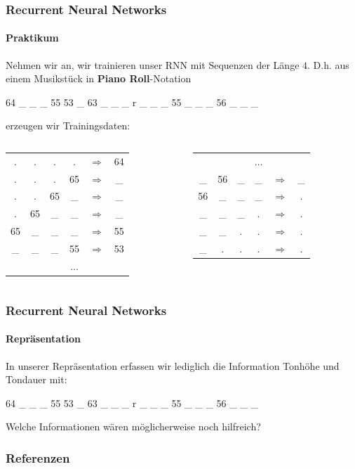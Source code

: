 \documentclass[aspectratio=169]{beamer}
\begin{document}
\begin{frame}
	\frametitle{Recurrent Neural Networks}
	\framesubtitle{Praktikum}
	Nehmen wir an, wir trainieren unser RNN mit Sequenzen der Länge $4$. D.h. aus einem Musikstück in \textbf{Piano Roll}-Notation
	\begin{center}
		64 \_ \_ \_ 55 53 \_ 63 \_ \_ \_ r \_ \_ \_ 55 \_ \_ \_ 56 \_ \_ \_ 
	\end{center}
	erzeugen wir Trainingsdaten:\\
	\begin{center}
	\begin{columns}[t]
		\begin{column}{0.4\textwidth}
			\begin{tabular}{c c c c c c}
				. & . & . & . & $\Rightarrow$ & 64 \\
				. & . & . & 65 & $\Rightarrow$ & \_ \\
				. & . & 65 & \_ & $\Rightarrow$ & \_ \\
				. & 65 & \_ & \_ & $\Rightarrow$ & \_ \\
				65 &  \_ & \_ & \_ & $\Rightarrow$ & 55 \\
				\_ & \_ & \_ & 55 & $\Rightarrow$ & 53 \\
				& & & $\ldots$ & & 
			\end{tabular}
		\end{column}
			\begin{column}{0.4\textwidth}
			\begin{tabular}{c c c c c c}
				& & & $\ldots$ & & \\
				\_ & 56 & \_ & \_ & $\Rightarrow$ & \_  \\
				56 & \_ & \_ & \_ & $\Rightarrow$ & .  \\
				\_ & \_ & \_ & . & $\Rightarrow$ & . \\
				\_ & \_ & . & . & $\Rightarrow$ & . \\ 
				\_ & . & . & . & $\Rightarrow$ & . 
			\end{tabular}
		\end{column}
	\end{columns}
\end{center}
\end{frame}

\begin{frame}[t]
	\frametitle{Recurrent Neural Networks}
	\framesubtitle{Repräsentation}
	In unserer Repräsentation erfassen wir lediglich die Information Tonhöhe und Tondauer mit:
	\begin{center}
		64 \_ \_ \_ 55 53 \_ 63 \_ \_ \_ r \_ \_ \_ 55 \_ \_ \_ 56 \_ \_ \_ 
	\end{center}
	Welche Informationen wären möglicherweise noch hilfreich?
\end{frame}

\begin{frame}[allowframebreaks]
	\frametitle{Referenzen}
	{\scriptsize%
		
		}
\end{frame}
\end{document}
